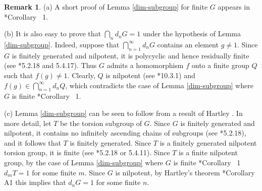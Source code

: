 \documentclass[a4paper,12pt,reqno,oneside]{amsart} %
\theoremstyle{plain}
\theoremstyle{definition}
\newtheorem{remark}[theorem]{Remark}
\theoremstyle{named}
\renewcommand{\:}{\colon}
\begin{document}
\begin{remark} (a) A short proof of Lemma \ref{dim-subgroup} for finite $G$ appears in \cite{Bu}*{Corollary~ 1}.

(b) It is also easy to prove that $\bigcap_n d_nG=1$ under the hypothesis of Lemma \ref{dim-subgroup}.
Indeed, suppose that $\bigcap_{n=1}^\infty d_nG$ contains an element $g\ne 1$.
Since $G$ is finitely generated and nilpotent, it is polycyclic and hence residually finite 
(see \cite{Rob}*{5.2.18 and 5.4.17}).
Thus $G$ admits a homomorphism $f$ onto a finite group $Q$ such that $f(g)\ne 1$.
Clearly, $Q$ is nilpotent (see \cite{Hall}*{10.3.1}) and $f(g)\in\bigcap_{n=1}^\infty d_nQ$, which contradicts 
the case of Lemma \ref{dim-subgroup} where $G$ is finite \cite{Bu}*{Corollary~ 1}.

(c) Lemma \ref{dim-subgroup} can be seen to follow from a result of Hartley \cite{Hart'}.
In more detail, let $T$ be the torsion subgroup of $G$.
Since $G$ is finitely generated and nilpotent, it contains no infinitely ascending chains of subgroups 
(see \cite{Rob}*{5.2.18}), and it follows that $T$ is finitely generated.
Since $T$ is a finitely generated nilpotent torsion group, it is finite (see \cite{Rob}*{5.2.18 or 5.4.11}).
Since $T$ is a finite nilpotent group, by the case of Lemma \ref{dim-subgroup} where $G$ is finite 
\cite{Bu}*{Corollary~ 1} $d_m T=1$ for some finite $m$.
Since $G$ is nilpotent, by Hartley's theorem \cite{Hart'}*{Corollary A1} this implies that $d_n G=1$ 
for some finite $n$.
\end{remark}
\end{document}
